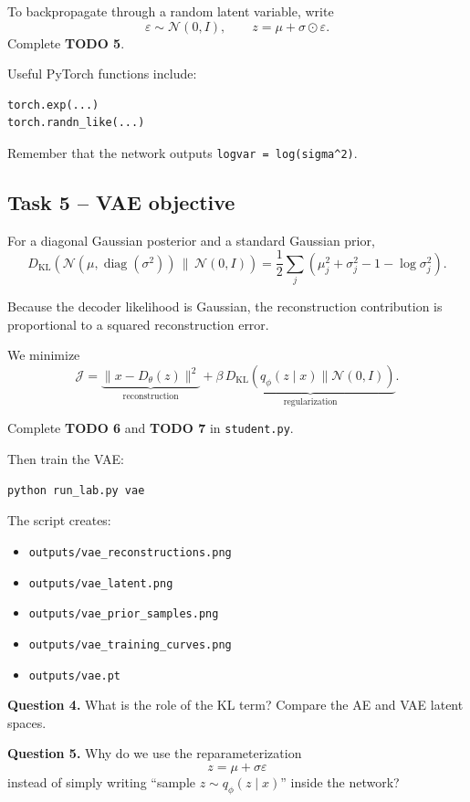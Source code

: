 \documentclass[11pt,a4paper]{article}
\newcommand{\question}[2]{%
  \vspace{0.4em}
  \noindent\textbf{Question #1.} #2
  \vspace{0.5em}
}
\begin{document}
To backpropagate through a random latent variable, write
\[
\varepsilon\sim\mathcal N(0,I),
\qquad
z=\mu+\sigma\odot\varepsilon.
\]
Complete \textbf{TODO 5}.

Useful PyTorch functions include:

\begin{lstlisting}[language=Python]
torch.exp(...)
torch.randn_like(...)
\end{lstlisting}

Remember that the network outputs \texttt{logvar = log(sigma\^{}2)}.

\subsection*{Task 5 -- VAE objective}

For a diagonal Gaussian posterior and a standard Gaussian prior,
\[
D_{\mathrm{KL}}\!\left(
\mathcal N(\mu,\operatorname{diag}(\sigma^2))
\,\|\,
\mathcal N(0,I)
\right)
=
\frac12\sum_j\left(\mu_j^2+\sigma_j^2-1-\log\sigma_j^2\right).
\]

Because the decoder likelihood is Gaussian, the reconstruction contribution is proportional to a squared reconstruction error.

We minimize
\[
\mathcal J
=
\underbrace{\|x-D_\theta(z)\|^2}_{\text{reconstruction}}
+\beta\,
\underbrace{D_{\mathrm{KL}}(q_\phi(z\mid x)\|\mathcal N(0,I))}_{\text{regularization}}.
\]

Complete \textbf{TODO 6} and \textbf{TODO 7} in \texttt{student.py}.

Then train the VAE:

\begin{lstlisting}[language=bash]
python run_lab.py vae
\end{lstlisting}

The script creates:
\begin{itemize}
  \item \texttt{outputs/vae\_reconstructions.png}
  \item \texttt{outputs/vae\_latent.png}
  \item \texttt{outputs/vae\_prior\_samples.png}
  \item \texttt{outputs/vae\_training\_curves.png}
  \item \texttt{outputs/vae.pt}
\end{itemize}

\question{4}{What is the role of the KL term? Compare the AE and VAE latent spaces.}

\question{5}{Why do we use the reparameterization
\[
z=\mu+\sigma\varepsilon
\]
instead of simply writing ``sample $z\sim q_\phi(z\mid x)$'' inside the network?}
\end{document}
